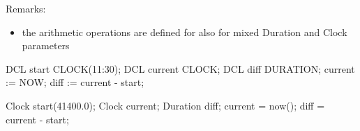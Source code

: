 Remarks:
\begin{itemize}
\item the arithmetic operations are defined for also for
   mixed Duration and Clock parameters
\end{itemize}


\begin{PEARLCode}
DCL start CLOCK(11:30);
DCL current CLOCK;
DCL diff DURATION;
current := NOW;
diff := current - start;
\end{PEARLCode}

\begin{CppCode}
Clock start(41400.0);
Clock current;
Duration diff;
current = now();
diff = current - start;
\end{CppCode}

